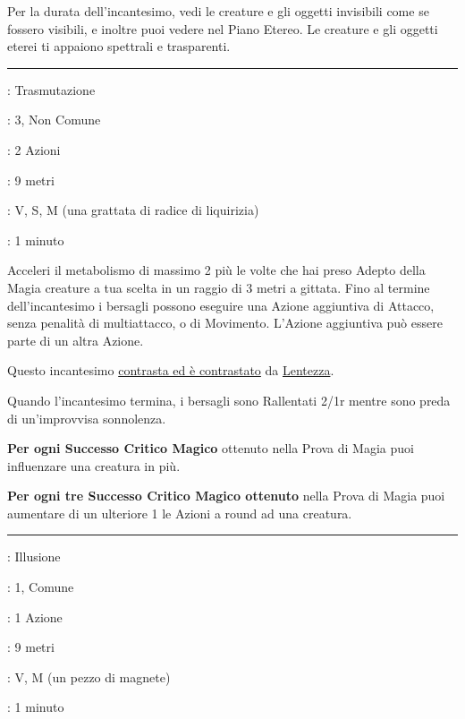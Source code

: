 \begin{multicols}{2}
Per la durata dell'incantesimo, vedi le creature e gli oggetti invisibili come se fossero visibili, e inoltre puoi vedere nel Piano Etereo. Le creature e gli oggetti eterei ti appaiono spettrali e trasparenti.

\smallskip\noindent\rule{\linewidth}{2pt} \hypertarget{Velocità}{}\smallskip{}
\noindent
\begin{description}[noitemsep, topsep=0pt, parsep=0pt, partopsep=0pt, leftmargin=0cm, labelwidth=2.8cm]
	\item[\textbf{Lista di Magia}]: Trasmutazione
	\item[\textbf{Livello}]: 3, Non Comune
	\item[\textbf{T. di Lancio}]: 2 Azioni
	\item[\textbf{Gittata}]: 9 metri
	\item[\textbf{Componenti}]: V, S, M (una grattata di radice di liquirizia)
	\item[\textbf{Durata}]: 1 minuto
\end{description}

Acceleri il metabolismo di massimo 2 più le volte che hai preso Adepto della Magia creature a tua scelta in un raggio di 3 metri a gittata. Fino al termine dell'incantesimo i bersagli possono eseguire una Azione aggiuntiva di Attacco, senza penalità di multiattacco, o di Movimento. L'Azione aggiuntiva può essere parte di un altra Azione.

Questo incantesimo \hyperlink{contrastareincantesimi}{contrasta ed è contrastato} da \hyperlink{lentezza}{Lentezza}.

Quando l'incantesimo termina, i bersagli sono Rallentati 2/1r mentre sono preda di un'improvvisa sonnolenza.

\textbf{Per ogni Successo Critico Magico} ottenuto nella Prova di Magia puoi influenzare una creatura in più.

\textbf{Per ogni tre Successo Critico Magico ottenuto} nella Prova di Magia puoi aumentare di un ulteriore 1 le Azioni a round ad una creatura.

\smallskip\noindent\rule{\linewidth}{2pt} \hypertarget{Ventriloquio}{}\smallskip{}
\noindent
\begin{description}[noitemsep, topsep=0pt, parsep=0pt, partopsep=0pt, leftmargin=0cm, labelwidth=2.8cm]
	\item[\textbf{Lista di Magia}]: Illusione
	\item[\textbf{Livello}]: 1, Comune
	\item[\textbf{T. di Lancio}]: 1 Azione
	\item[\textbf{Gittata}]: 9 metri
	\item[\textbf{Componenti}]: V, M (un pezzo di magnete)
	\item[\textbf{Durata}]: 1 minuto
\end{description}


\end{multicols}
